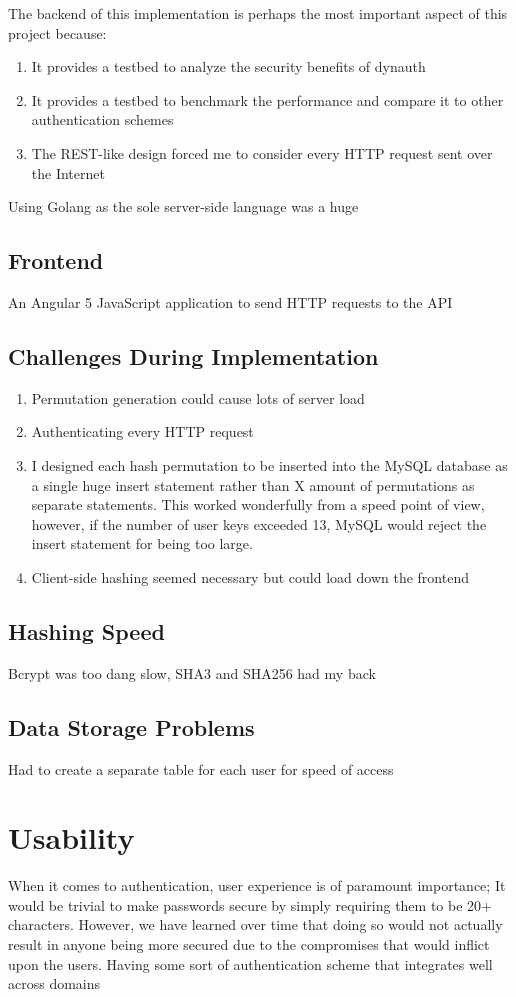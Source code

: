 \documentclass[conference]{IEEEtran}
\begin{document}
	The backend of this implementation is perhaps the most important aspect of this project because:
	\begin{enumerate}
		\item It provides a testbed to analyze the security benefits of dynauth
		\item It provides a testbed to benchmark the performance and compare it to other authentication schemes
		\item The REST-like design forced me to consider every HTTP request sent over the Internet
	\end{enumerate}
	Using Golang as the sole server-side language was a huge 
\subsection{Frontend}
	An Angular 5 JavaScript application to send HTTP requests to the API

\subsection{Challenges During Implementation}
	\begin{enumerate}
		\item Permutation generation could cause lots of server load
		\item Authenticating every HTTP request
		\item I designed each hash permutation to be inserted into the MySQL database as a single huge insert statement rather than X amount of permutations as separate statements. This worked wonderfully from a speed point of view, however, if the number of user keys exceeded 13, MySQL would reject the insert statement for being too large.
		\item Client-side hashing seemed necessary but could load down the frontend
	\end{enumerate}
\subsection{Hashing Speed}
	Bcrypt was too dang slow, SHA3 and SHA256 had my back
\subsection{Data Storage Problems}
	Had to create a separate table for each user for speed of access

\section{Usability}
	When it comes to authentication, user experience is of paramount importance; It would be trivial to make passwords secure by simply requiring them to be 20+ characters. However, we have learned over time that doing so would not actually result in anyone being more secured due to the compromises that would inflict upon the users\cite[Need to cite]{cite here}. Having some sort of authentication scheme that integrates well across domains 
\end{document}
